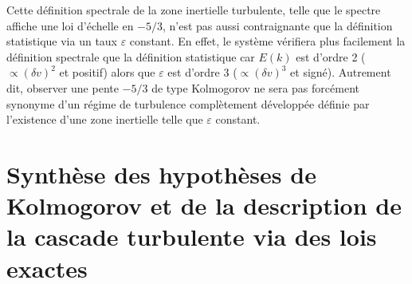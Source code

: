  Cette définition spectrale de la zone inertielle turbulente, telle que le spectre affiche une loi d'échelle en $-5/3$, n'est pas aussi contraignante que la définition statistique via un taux $\varepsilon$ constant. En effet, le système vérifiera plus facilement la définition spectrale que la définition statistique car $E(k)$ est d'ordre 2 ($\propto (\delta v)^2$ et positif) alors que $\varepsilon$ est d'ordre 3 ($\propto (\delta v)^3$ et signé). Autrement dit, observer une pente $-5/3$ de type Kolmogorov ne sera pas forcément synonyme d'un régime de turbulence complètement développée définie par l'existence d'une zone inertielle telle que $\varepsilon$ constant. 
 
 \section{Synthèse des hypothèses de Kolmogorov et de la description de la cascade turbulente via des lois exactes}
 \label{synt-01}
